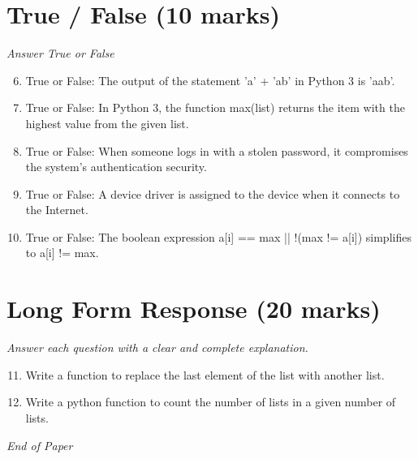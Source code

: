\documentclass[12pt]{article}
\begin{document}
\section*{True / False (10 marks)}
\textit{Answer True or False}
\begin{enumerate}[label=\arabic*.]
\setcounter{enumi}{5}
\item True or False: The output of the statement 'a' + 'ab' in Python 3 is 'aab'.
\item True or False: In Python 3, the function max(list) returns the item with the highest value from the given list.
\item True or False: When someone logs in with a stolen password, it compromises the system's authentication security.
\item True or False: A device driver is assigned to the device when it connects to the Internet.
\item True or False: The boolean expression a[i] == max || !(max != a[i]) simplifies to a[i] != max.
\end{enumerate}

\section*{Long Form Response (20 marks)}
\textit{Answer each question with a clear and complete explanation.}
\begin{enumerate}[label=\arabic*.]
\setcounter{enumi}{10}
\item Write a function to replace the last element of the list with another list.
\item Write a python function to count the number of lists in a given number of lists.
\end{enumerate}

\vfill
\noindent\textit{End of Paper}
\end{document}
